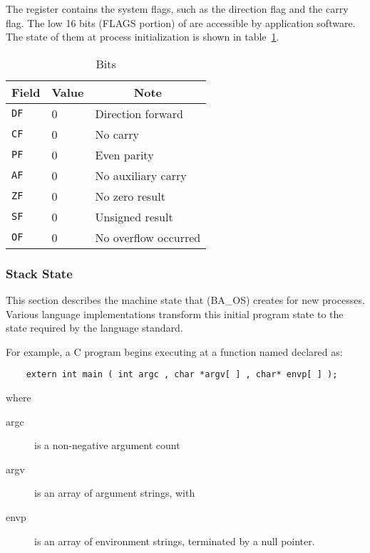 The  register contains the system flags, such as the
direction flag and the carry flag.  The low 16 bits (FLAGS portion)
of  are accessible by
application software.  The state of them at process initialization
is shown in table~\ref{eflags-status}.

\begin{table}[H]
\Hrule
  \caption{ Bits}
  \label{eflags-status}
  \begin{center}
    \begin{tabular}[t]{l|l|l}
      \multicolumn{1}{c}{Field} & \multicolumn{1}{c}{Value}& \multicolumn{1}{c}{Note} \\
      \hline
      \texttt{DF} & 0 & Direction forward\\
      \texttt{CF} & 0 & No carry\\
      \texttt{PF} & 0 & Even parity\\
      \texttt{AF} & 0 & No auxiliary carry\\
      \texttt{ZF} & 0 & No zero result\\
      \texttt{SF} & 0 & Unsigned result\\
      \texttt{OF} & 0 & No overflow occurred\\
    \end{tabular}
  \end{center}
\Hrule
\end{table}

\subsubsection{Stack State}

This section describes the machine state that (BA\_OS) creates
for new processes. Various language implementations transform this
initial program state to the state required by the language standard.

For example, a C program begins executing at a
function named  declared as:

\begin{footnotesize}
\begin{verbatim}
    extern int main ( int argc , char *argv[ ] , char* envp[ ] );
\end{verbatim}
\end{footnotesize}

where
\begin{description}
 \item[argc] is a non-negative argument count
 \item[argv] is an array of argument strings, with 
 \item[envp] is an array of environment strings,
             terminated by a null pointer.
\end{description}


